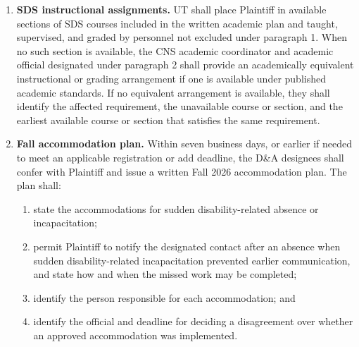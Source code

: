 \documentclass[12pt]{article}
\begin{document}
\begin{enumerate}
\begin{enumerate}[label=(\alph*),leftmargin=0.45in]
  \item the resulting course sequence and completion date under each available option.
  \end{enumerate}

An ordinary registration or add deadline that expires while the determination is pending shall not bar Plaintiff from enrolling in a course the official approves. UT shall reserve a seat when practicable, use an administrative add, or extend the applicable deadline. If the official declines every SDS 320E or SDS 324E option that would avoid an additional semester, the written determination shall identify the academic requirement affected by each option and explain why no equivalent arrangement is available.

\item \textbf{SDS instructional assignments.} UT shall place Plaintiff in available sections of SDS courses included in the written academic plan and taught, supervised, and graded by personnel not excluded under paragraph 1. When no such section is available, the CNS academic coordinator and academic official designated under paragraph 2 shall provide an academically equivalent instructional or grading arrangement if one is available under published academic standards. If no equivalent arrangement is available, they shall identify the affected requirement, the unavailable course or section, and the earliest available course or section that satisfies the same requirement.

\item \textbf{Fall accommodation plan.} Within seven business days, or earlier if needed to meet an applicable registration or add deadline, the D\&A designees shall confer with Plaintiff and issue a written Fall 2026 accommodation plan. The plan shall:

  \begin{enumerate}[label=(\alph*),leftmargin=0.45in]
  \item state the accommodations for sudden disability-related absence or incapacitation;

  \item permit Plaintiff to notify the designated contact after an absence when sudden disability-related incapacitation prevented earlier communication, and state how and when the missed work may be completed;

  \item identify the person responsible for each accommodation; and

  \item identify the official and deadline for deciding a disagreement over whether an approved accommodation was implemented.
  \end{enumerate}


\end{enumerate}
\end{document}
